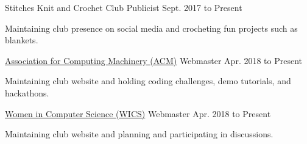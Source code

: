
\begin{cventry}
    {Stitches Knit and Crochet Club}
    {Publicist}
    {Sept. 2017 to Present}
    {}{}
    \begin{cvparagraph}
        Maintaining club presence on social media and crocheting fun projects such as blankets.
    \end{cvparagraph}
\end{cventry}

\begin{cventry}
    {\href{https://www.tcnj.edu/~acm}{Association for Computing Machinery (ACM)}}
    {Webmaster}
    {Apr. 2018 to Present}
    {}{}
    \begin{cvparagraph}
        Maintaining club website and holding coding challenges, demo tutorials, and hackathons.
    \end{cvparagraph}
\end{cventry}

\begin{cventry}
    {\href{https://www.tcnj.edu/~wics}{Women in Computer Science (WICS)}}
    {Webmaster}
    {Apr. 2018 to Present}
    {}{}
    \begin{cvparagraph}
        Maintaining club website and planning and participating in discussions.
    \end{cvparagraph}
\end{cventry}